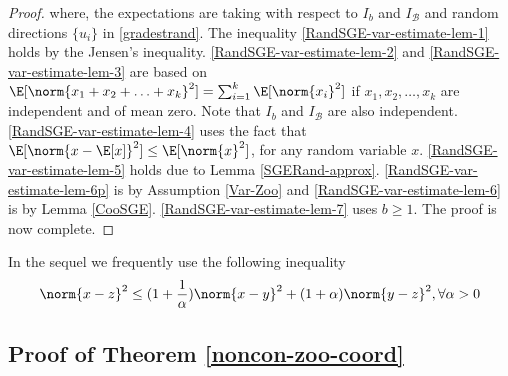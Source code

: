 \begin{proof}
 where, the expectations are taking with respect to $I_b$ and $I_{\mathcal{B}}$ and random directions $\{u_i\}$ in \eqref{gradestrand}. The inequality \eqref{RandSGE-var-estimate-lem-1} holds by the Jensen’s inequality. \eqref{RandSGE-var-estimate-lem-2} and \eqref{RandSGE-var-estimate-lem-3} are based on $\E[\norm{x_1+x_2+\ldots+x_k}^2] = \sum_{i=1}^k \E[\norm{x_i}^2]$ if $x_1,x_2,\ldots,x_k$ are independent and of mean zero. Note that $I_b$ and $I_{\mathcal{B}}$ are also independent. \eqref{RandSGE-var-estimate-lem-4} uses the fact that $\E[\norm{x-\E[x]}^2] \leq \E[\norm{x}^2]$, for any random variable $x$. \eqref{RandSGE-var-estimate-lem-5} holds due to Lemma \ref{SGERand-approx}. \eqref{RandSGE-var-estimate-lem-6p} is by Assumption \ref{Var-Zoo} and  \eqref{RandSGE-var-estimate-lem-6} is by Lemma \ref{CooSGE}. \eqref{RandSGE-var-estimate-lem-7} uses $b\geq 1$. The proof is now complete.
\end{proof}
In the sequel we frequently use the following inequality
\begin{equation}\label{young}
\norm{x-z}^2 \leq (1+\frac{1}{\alpha})\norm{x-y}^2 + (1+\alpha) \norm{{y-z}}^2, \forall \alpha> 0
\end{equation}
\noindent\subsection{Proof of Theorem \ref{noncon-zoo-coord}}
